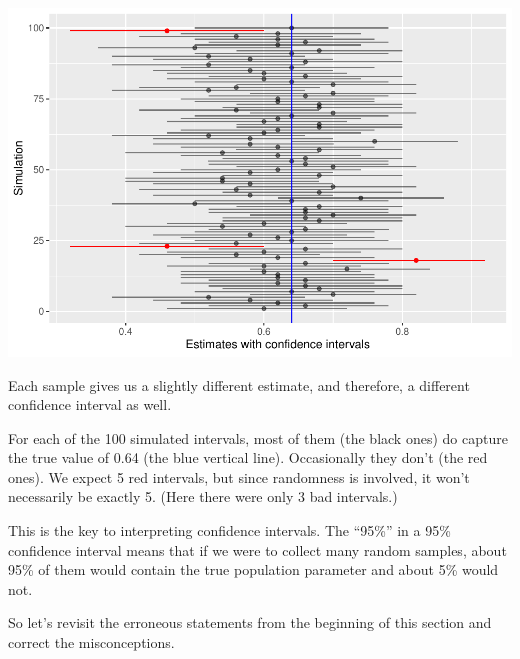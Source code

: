 \documentclass[
]{book}
\begin{document}
\includegraphics{intro_stats_files/figure-latex/unnamed-chunk-334-1.pdf}

Each sample gives us a slightly different estimate, and therefore, a different confidence interval as well.

For each of the 100 simulated intervals, most of them (the black ones) do capture the true value of 0.64 (the blue vertical line). Occasionally they don't (the red ones). We expect 5 red intervals, but since randomness is involved, it won't necessarily be exactly 5. (Here there were only 3 bad intervals.)

This is the key to interpreting confidence intervals. The ``95\%'' in a 95\% confidence interval means that if we were to collect many random samples, about 95\% of them would contain the true population parameter and about 5\% would not.

So let's revisit the erroneous statements from the beginning of this section and correct the misconceptions.
\end{document}
